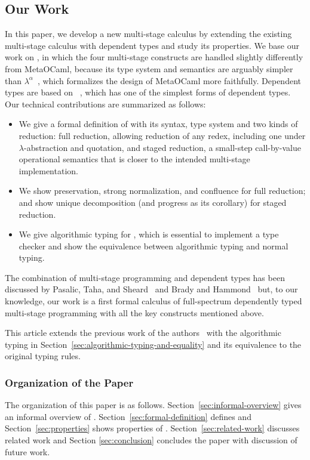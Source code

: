 \subsection{Our Work}
In this paper, we develop a new multi-stage calculus \LMD by extending the
existing multi-stage calculus \LTP\cite{HanadaIgarashi2014CSP} with dependent types and
study its properties.  We base our work on \LTP, in which the four multi-stage
constructs are handled slightly differently from MetaOCaml, because its type
system and semantics are arguably simpler than
\(\lambda^\alpha\)~\cite{TahaNielsen2003Environment}, which formalizes the design of
MetaOCaml more faithfully.  Dependent types are based on \LLF~\cite{benjamin2005attapldependent},
which has one of the simplest forms of dependent types.  Our technical
contributions are summarized as follows:
\begin{itemize}
    \item We give a formal definition of \LMD with its syntax, type system and
        two kinds of reduction: full reduction, allowing reduction of any redex,
        including one under $\lambda$-abstraction and quotation, and staged reduction, a
        small-step call-by-value operational semantics that is closer to the intended
        multi-stage implementation.
    \item We show preservation, strong normalization, and confluence for full
        reduction; and show unique decomposition (and progress as its
        corollary) for staged reduction.
    \item We give algorithmic typing for \LMD, which is essential to implement
        a type checker and show the equivalence between algorithmic typing and
        normal typing.
\end{itemize}
The combination of multi-stage programming and dependent types has been
discussed by Pasalic, Taha, and Sheard~\cite{PasalicTahaSheard2002Tagless} and Brady and
Hammond~\cite{BradyHammond2006Dependently} but, to our knowledge, our work is a first
formal calculus of full-spectrum dependently typed multi-stage programming with
all the key constructs mentioned above.

This article extends the previous work of the
authors~\cite{kawata2019dependently} with the algorithmic typing in
Section~\ref{sec:algorithmic-typing-and-equality} and its equivalence to the
original typing rules.

\subsubsection{Organization of the Paper}

The organization of this paper is as follows.
Section~\ref{sec:informal-overview} gives an informal overview of
\LMD. Section~\ref{sec:formal-definition} defines \LMD and
Section~\ref{sec:properties} shows properties of \LMD.
Section~\ref{sec:related-work} discusses related work and Section
\ref{sec:conclusion} concludes the paper with discussion of future
work.
